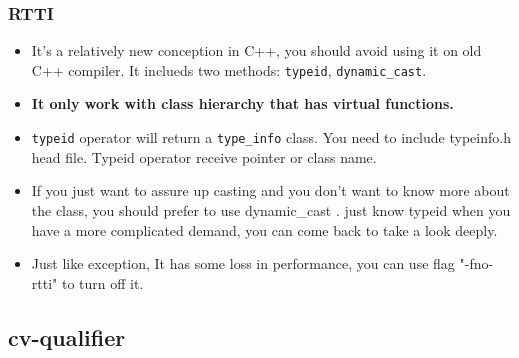 \documentclass[a4paper,12pt,twoside]{book}
\begin{document}
\subsubsection{RTTI}
\begin{itemize}
\item It's a relatively new conception in C++, you should avoid using it on old C++ compiler. It inclueds two methods: \texttt{typeid}, \texttt{dynamic\_cast}.
\item \textbf{It only work with class hierarchy that has virtual functions. }

\item \texttt{typeid} operator will return a \texttt{type\_info} class.  You need to include typeinfo.h head file. Typeid operator receive pointer or class name.

\item If you just want to assure up casting and you don't want to know more about the class, you should prefer to use dynamic\_cast . just know typeid when you have a more complicated demand, you can come back to take a look deeply.

\item Just like exception, It has some loss in performance, you can use flag "-fno-rtti" to turn off it.
\end{itemize}


\subsection{cv-qualifier}
\end{document}
